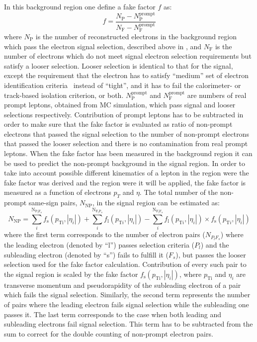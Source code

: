 In this background region one define a fake factor $f$ as:
\begin{equation}
f = \frac{N_{\mathrm{P}} - N_{\mathrm{P}}^{\mathrm{prompt}}}{N_{\mathrm{F}}  - N_{\mathrm{F}}^{\mathrm{prompt}}}
\label{eq:fakefactor}
\end{equation}
where $N_{\mathrm{P}}$ is the number of reconstructed electrons in the background region which pass the electron signal selection,
described above in , and $N_{\mathrm{F}}$ is the number of electrons which do not meet 
signal electron selection requirements but satisfy a looser selection. Looser selection is identical to that for the signal, except 
the requirement that the electron has to satisfy ``medium'' set of electron identification criteria~\cite{electron_tight} instead of ``tight'',
and it has to fail the calorimeter- or track-based isolation criterion, or both.
$N_{\mathrm{P}}^{\mathrm{prompt}}$ and $N_{\mathrm{F}}^{\mathrm{prompt}}$ are numbers of real prompt
leptons, obtained from MC simulation, which pass signal and looser selections respectively.
Contribution of prompt leptons has to be subtracted in order to make sure that 
the fake factor is evaluated as ratio of non-prompt electrons that passed the signal selection to
the number of non-prompt electrons that passed the looser selection and there is no contamination from real prompt leptons.
When the fake factor has been measured in the background region it can be used to predict the non-prompt background in the signal region.
In order to take into account possible different kinematics of a lepton in the region were the fake factor was derived 
and the region were it will be applied, the fake factor is measured as a function of electrons $p_T$ and $\eta$.
The total number of the non-prompt same-sign pairs, $N_{\mathrm{NP}}$, in the signal region can be estimated as:
\begin{equation}
N_{\mathrm{NP}} = \sum_{i}^{\mathrm{N_{P_l F_s}}} f_{\mathrm{s}}(p_{\mathrm{Ti}},|\eta_{i}|) + \sum_{i}^{\mathrm{N_{F_l P_s}}} f_{\mathrm{l}}(p_{\mathrm{T}i},|\eta_{i}|) - \sum_{i}^{\mathrm{N_{F_l F_s}}} f_{\mathrm{l}}(p_{\mathrm{T}i},|\eta_{i}|) \times f_{\mathrm{s}}(p_{\mathrm{T}i},|\eta_{i}|)
\label{eq:fake_pred}
\end{equation}
where the first term corresponds to the number of electron pairs ($N_{P_l F_s}$) 
where the leading electron (denoted by ``l'') passes selection criteria ($P_l$) and the subleading electron 
(denoted by ``s'')
fails to fulfill it ($F_s$), but passes the looser selection used for the fake factor calculation. 
Contribution of every such pair to the signal region is scaled by the fake factor 
$f_{\mathrm{s}}(p_{\mathrm{Ti}},|\eta_{i}|)$, where $p_\mathrm{Ti}$ and $\eta_{i}$ are transverse momentum and pseudorapidity
of the subleading electron of a pair which fails the signal selection. 
Similarly, the second term represents the number of pairs where
the leading electron fails signal selection while the subleading one passes it. 
The last term corresponds to the case when both leading
and subleading electrons fail signal selection. This term has to be subtracted from the sum to correct for the double
counting of non-prompt electron pairs.

